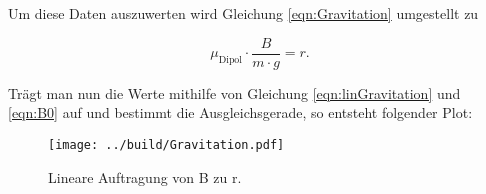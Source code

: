 \noindent Um diese Daten auszuwerten wird Gleichung \eqref{eqn:Gravitation} umgestellt zu

\begin{equation}
    \mu_\text{Dipol} \cdot \frac{B}{m \cdot g} =  r .
    \label{eqn:linGravitation}
\end{equation}

\noindent
Trägt man nun die Werte mithilfe von Gleichung \eqref{eqn:linGravitation}  und \eqref{eqn:B0} auf und bestimmt die Ausgleichsgerade, so entsteht folgender Plot:

\begin{figure}
    \texttt{[image: ../build/Gravitation.pdf]}
    \caption{Lineare Auftragung von B zu r.}  
\end{figure}


